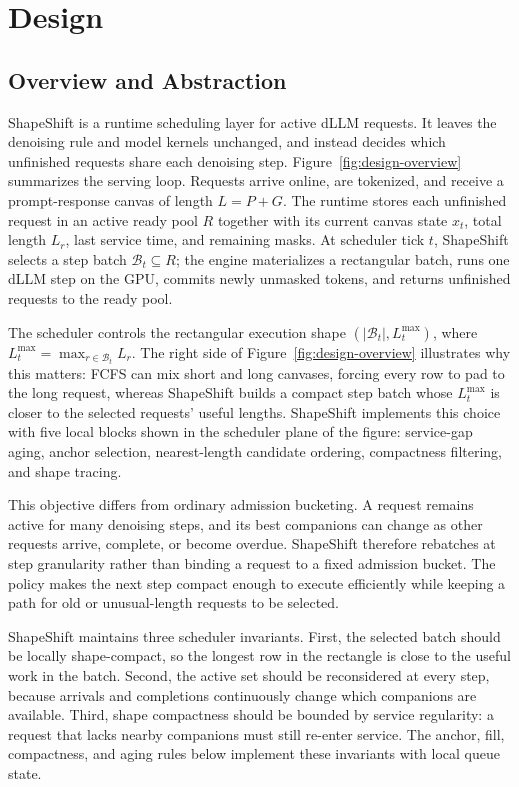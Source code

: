 \documentclass[letterpaper]{article} \usepackage[submission]{aaai2027} \usepackage[hyphens]{url} \usepackage{graphicx} \usepackage{subcaption} \urlstyle{rm} \def\UrlFont{\rm} \usepackage{natbib} \usepackage{amsmath} \usepackage{amssymb} \usepackage{booktabs} \usepackage{multirow} \usepackage{algorithm} \usepackage{algorithmic}
\begin{document}
\section{Design}

\subsection{Overview and Abstraction}

ShapeShift is a runtime scheduling layer for active dLLM requests. It leaves the denoising rule and model kernels unchanged, and instead decides which unfinished requests share each denoising step. Figure~\ref{fig:design-overview} summarizes the serving loop. Requests arrive online, are tokenized, and receive a prompt-response canvas of length $L=P+G$. The runtime stores each unfinished request in an active ready pool $R$ together with its current canvas state $x_t$, total length $L_r$, last service time, and remaining masks. At scheduler tick $t$, ShapeShift selects a step batch $\mathcal{B}_t\subseteq R$; the engine materializes a rectangular batch, runs one dLLM step on the GPU, commits newly unmasked tokens, and returns unfinished requests to the ready pool.

The scheduler controls the rectangular execution shape $(|\mathcal{B}_t|,L_t^{\max})$, where $L_t^{\max}=\max_{r\in\mathcal{B}_t}L_r$. The right side of Figure~\ref{fig:design-overview} illustrates why this matters: FCFS can mix short and long canvases, forcing every row to pad to the long request, whereas ShapeShift builds a compact step batch whose $L_t^{\max}$ is closer to the selected requests' useful lengths. ShapeShift implements this choice with five local blocks shown in the scheduler plane of the figure: service-gap aging, anchor selection, nearest-length candidate ordering, compactness filtering, and shape tracing.

This objective differs from ordinary admission bucketing. A request remains active for many denoising steps, and its best companions can change as other requests arrive, complete, or become overdue. ShapeShift therefore rebatches at step granularity rather than binding a request to a fixed admission bucket. The policy makes the next step compact enough to execute efficiently while keeping a path for old or unusual-length requests to be selected.

ShapeShift maintains three scheduler invariants. First, the selected batch should be locally shape-compact, so the longest row in the rectangle is close to the useful work in the batch. Second, the active set should be reconsidered at every step, because arrivals and completions continuously change which companions are available. Third, shape compactness should be bounded by service regularity: a request that lacks nearby companions must still re-enter service. The anchor, fill, compactness, and aging rules below implement these invariants with local queue state.
\end{document}
